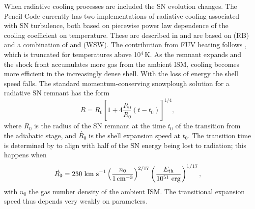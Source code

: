 \documentclass[fleqn,usenatbib]{mnras}
\newcommand\EST{E_{\rm th}}
\newcommand\erg{~ {\rm erg}}
\newcommand\kms{~ {\rm km~ s}^{-1}}
\def\cmcube{{\,{\rm cm}^{-3}}}
\begin{document}
When radiative cooling processes are included the SN evolution
changes.
The Pencil Code currently has two implementations of radiative cooling
associated with SN turbulence, both based on piecewise power law
dependence {of the cooling coefficient} on
temperature.
These are described in \citet[][see their figure\,1]{Gent:2013a} and are based
on \citet{RBN93} {(RB)} and a combination of \citet{WHMTB95}
and \citet{SW87} {(WSW)}.  
{The contribution from FUV heating follows
\citet[][see \citep{Gent:2013a}]{WHMTB95}, which is truncated for temperatures
above 10$^{4}$\,K.}
As the remnant expands and the shock front accumulates more gas from the
ambient ISM, cooling becomes more efficient in the increasingly dense shell.
With the loss of energy the shell speed falls.  
The standard momentum-conserving snowplough solution for a radiative SN
remnant has the form
  \begin{equation}
    \label{eq:snpl}
    R=R_{0}\left[1+4\frac{\dot{R_{0}}}{R_{0}}(t-t_{0})\right]^{{1}/{4}} ,
  \end{equation}
  where $R_{0}$ is the radius of the SN remnant at the time $t_{0}$ of the 
  transition from the adiabatic stage, and $\dot{R_{0}}$ is the shell expansion
  speed at $t_{0}$. 
  The transition time is determined by \citet{Woltjer72} 
  to align with half of the SN energy being lost to radiation; this happens when
  \begin{equation}
    \dot{R_{0}}=230\kms \left(\frac{n_{0}}{1\cmcube}\right)^{{2}/{17}}\left(\frac{\EST}{10^{51}\erg}\right)^
  {{1}/{17}},
  \end{equation}
  with $n_0$ the gas number density of the ambient ISM. 
  The transitional expansion speed thus depends very weakly on parameters.
  
\end{document}
